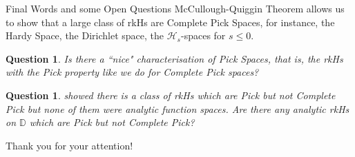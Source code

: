 \documentclass{beamer}
\newtheorem{question}[theorem]{Question}
\newcommand{\D}{\mathbb D}
\renewcommand{\le}{\leqslant}
\newcommand{\calH}{{\mathcal H}}
\begin{document}
\begin{frame}{Final Words and some Open Questions}
McCullough-Quiggin Theorem allows us to show that a large class of rkHs are Complete Pick Spaces, for instance, the Hardy Space, the Dirichlet space, the $\calH _{s}$-spaces for $s\le 0$. \pause
\begin{question}
Is there a ``nice" characterisation of Pick Spaces, that is, the rkHs with the Pick property like we do for Complete Pick spaces?
\end{question}
\pause
\begin{question}
\citeauthor{MR2187439}  showed there is a class of rkHs which are Pick but not Complete Pick but none of them were analytic function spaces. Are there any analytic rkHs on $\D$ which are Pick but not Complete Pick?
\end{question}
\end{frame}

\begin{frame}[allowframebreaks]
\nocite{*}
\printbibliography
\end{frame}
\begin{frame}[standout]
  Thank you for your attention!
\end{frame}
\end{document}
